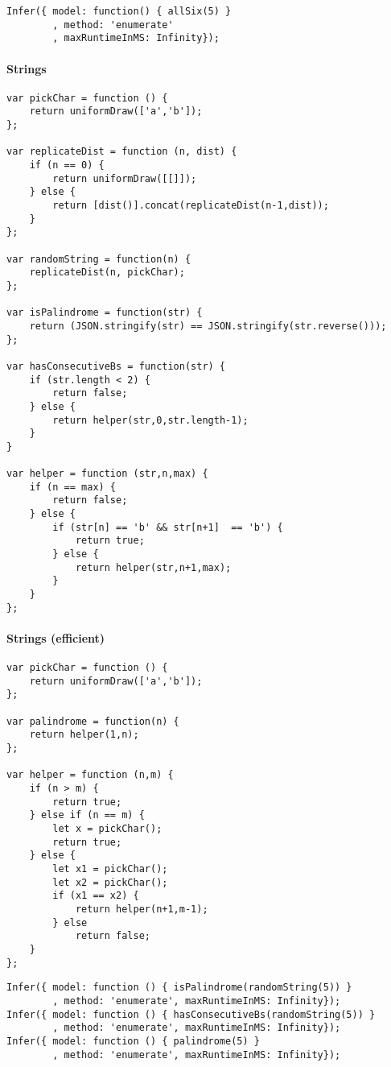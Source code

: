 \begin{verbatim}
Infer({ model: function() { allSix(5) }
        , method: 'enumerate'
        , maxRuntimeInMS: Infinity});
\end{verbatim}

\paragraph{Strings}

\begin{verbatim}
var pickChar = function () {
    return uniformDraw(['a','b']);
};

var replicateDist = function (n, dist) {
    if (n == 0) {
        return uniformDraw([[]]);
    } else {
        return [dist()].concat(replicateDist(n-1,dist));
    }
};

var randomString = function(n) {
    replicateDist(n, pickChar);
};

var isPalindrome = function(str) {
    return (JSON.stringify(str) == JSON.stringify(str.reverse()));
};

var hasConsecutiveBs = function(str) {
    if (str.length < 2) {
        return false;
    } else {
        return helper(str,0,str.length-1);
    }
}

var helper = function (str,n,max) {
    if (n == max) {
        return false;
    } else {
        if (str[n] == 'b' && str[n+1]  == 'b') {
            return true;
        } else {
            return helper(str,n+1,max);
        }
    }
};
\end{verbatim}

\paragraph{Strings (efficient)}

\begin{verbatim}
var pickChar = function () {
    return uniformDraw(['a','b']);
};

var palindrome = function(n) {
    return helper(1,n);
};

var helper = function (n,m) {
    if (n > m) {
        return true;
    } else if (n == m) {
        let x = pickChar();
        return true;
    } else {
        let x1 = pickChar();
        let x2 = pickChar();
        if (x1 == x2) {
            return helper(n+1,m-1);
        } else
            return false;
    }
};
\end{verbatim}

\begin{verbatim}
Infer({ model: function () { isPalindrome(randomString(5)) }
        , method: 'enumerate', maxRuntimeInMS: Infinity});
Infer({ model: function () { hasConsecutiveBs(randomString(5)) }
        , method: 'enumerate', maxRuntimeInMS: Infinity});
Infer({ model: function () { palindrome(5) }
        , method: 'enumerate', maxRuntimeInMS: Infinity});
\end{verbatim}


